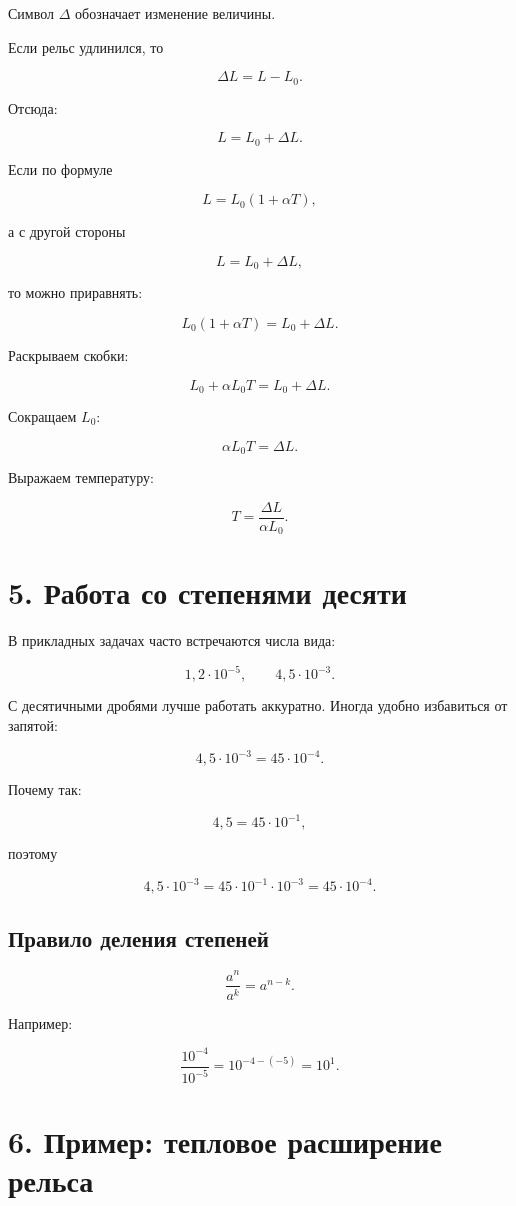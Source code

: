 \documentclass[a4paper,12pt]{article}
\begin{document}
Символ \(\Delta\) обозначает изменение величины.

Если рельс удлинился, то

\[
\Delta L=L-L_0.
\]

Отсюда:

\[
L=L_0+\Delta L.
\]

Если по формуле

\[
L=L_0(1+\alpha T),
\]

а с другой стороны

\[
L=L_0+\Delta L,
\]

то можно приравнять:

\[
L_0(1+\alpha T)=L_0+\Delta L.
\]

Раскрываем скобки:

\[
L_0+\alpha L_0T=L_0+\Delta L.
\]

Сокращаем \(L_0\):

\[
\alpha L_0T=\Delta L.
\]

Выражаем температуру:

\[
T=\frac{\Delta L}{\alpha L_0}.
\]

\section*{5. Работа со степенями десяти}

В прикладных задачах часто встречаются числа вида:

\[
1{,}2\cdot10^{-5},
\qquad
4{,}5\cdot10^{-3}.
\]

С десятичными дробями лучше работать аккуратно. Иногда удобно избавиться от запятой:

\[
4{,}5\cdot10^{-3}=45\cdot10^{-4}.
\]

Почему так:

\[
4{,}5=45\cdot10^{-1},
\]

поэтому

\[
4{,}5\cdot10^{-3}=45\cdot10^{-1}\cdot10^{-3}=45\cdot10^{-4}.
\]

\subsection*{Правило деления степеней}

\[
\frac{a^n}{a^k}=a^{n-k}.
\]

Например:

\[
\frac{10^{-4}}{10^{-5}}=10^{-4-(-5)}=10^1.
\]

\section*{6. Пример: тепловое расширение рельса}
\end{document}
